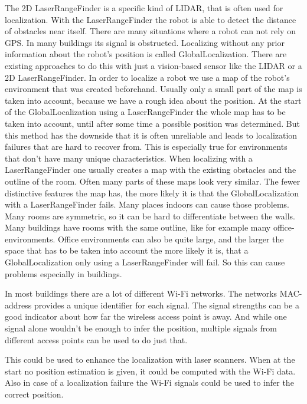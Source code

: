 The 2D \gls{LaserRangeFinder} is a specific kind of \Gls{LIDAR}, that is often used for localization. With the \gls{LaserRangeFinder} the robot is able to detect the distance of obstacles near itself. There are many situations where a robot can not rely on \Gls{GPS}. In many buildings its signal is obstructed.
Localizing without any prior information about the robot's position is called \gls{GlobalLocalization}.
There are existing approaches to do this with just a vision-based sensor like the \Gls{LIDAR} or a 2D \gls{LaserRangeFinder}. In order to localize a robot we use a map of the robot's environment that was created beforehand. Usually only a small part of the map is taken into account, because we have a rough idea about the position.  
At the start of the \gls{GlobalLocalization} using a \gls{LaserRangeFinder} the whole map has to be taken into account, until after some time a possible position was determined.
But this method has the downside that it is often unreliable and leads to localization failures that are hard to recover from. This is especially true for environments that don't have many unique characteristics. When localizing with a \gls{LaserRangeFinder} one usually creates a map with the existing obstacles and the outline of the room. Often many parts of these maps look very similar. The fewer distinctive features the map has, the more likely it is that the \gls{GlobalLocalization} with a \gls{LaserRangeFinder} fails. 
Many places indoors can cause those problems. Many rooms are symmetric, so it can be hard to differentiate between the walls. Many buildings have rooms with the same outline, like for example many office-environments. Office environments can also be quite large, and the larger the space that has to be taken into account the more likely it is, that a \gls{GlobalLocalization} only using a \gls{LaserRangeFinder} will fail. So this can cause problems especially in buildings.
 
In most buildings there are a lot of different Wi-Fi \citep{ieee802.11-2012} networks. The networks \Gls{MAC-address} provides a unique identifier for each signal. The signal strengths can be a good indicator about how far the wireless access point is away. And while one signal alone wouldn't be enough to infer the position, multiple signals from different access points can be used to do just that.

This could be used to enhance the localization with laser scanners. When at the start no position estimation is given, it could be computed with the Wi-Fi data. Also in case of a localization failure the Wi-Fi signals could be used to infer the correct position.

